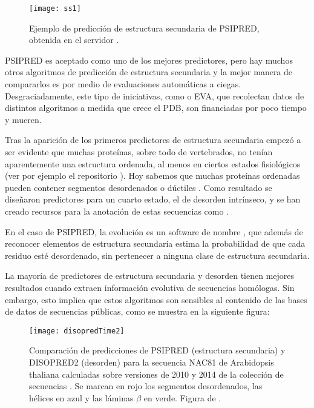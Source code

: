 \begin{figure}
\begin{center} 
\texttt{[image: ss1]}
\caption%
{
Ejemplo de predicci\'{o}n de estructura secundaria de PSIPRED, 
obtenida en el servidor .
}
\label{fig:psipred}
\end{center}
\end{figure}

PSIPRED es aceptado como uno de los mejores predictores, pero hay muchos otros algoritmos de predicci\'{o}n de estructura secundaria y 
la mejor manera de compararlos es por medio de evaluaciones autom\'{a}ticas a ciegas. Desgraciadamente, este tipo de iniciativas, como  
 o EVA,  
que recolectan datos de distintos algoritmos a medida que crece el PDB, son financiadas por poco tiempo y mueren.

Tras la aparici\'{o}n de los primeros predictores de estructura secundaria empez\'{o} a ser evidente que muchas prote\'{i}nas, 
sobre todo de vertebrados, no ten\'{i}an aparentemente una estructura ordenada, al menos en ciertos estados fisiol\'{o}gicos 
(ver por ejemplo el repositorio  \citep{Sickmeier2007,yruela_inmaculada_2014_1066352}).
Hoy sabemos que muchas prote\'{i}nas ordenadas pueden contener segmentos desordenados o d\'{u}ctiles \citep{Lobanov2010}.
Como resultado se dise\~naron predictores para un cuarto estado, el de desorden intr\'{i}nseco, y se han creado recursos para la 
anotaci\'{o}n de estas secuencias como .

En el caso de PSIPRED, la evoluci\'{o}n es un software de nombre
 \citep{Ward2004},
que adem\'{a}s de reconocer elementos de estructura secundaria estima la probabilidad de que cada residuo est\'{e} desordenado,
sin pertenecer a ninguna clase de estructura secundaria.

La mayor\'{i}a de predictores de estructura secundaria y desorden tienen mejores resultados cuando
extraen informaci\'{o}n evolutiva de secuencias hom\'{o}logas. Sin embargo, esto implica que 
estos algoritmos son sensibles al contenido de las bases de datos de secuencias p\'{u}blicas, 
como se muestra en la siguiente figura:

\begin{figure}
\begin{center} 
\texttt{[image: disopredTime2]}
\caption%
{
Comparaci\'{o}n de predicciones de PSIPRED (estructura secundaria) y DISOPRED2 (desorden) 
para la secuencia NAC81 de Arabidopsis thaliana calculadas sobre versiones de 2010 y 2014 
de la colecci\'{o}n de secuencias .
Se marcan en rojo los segmentos desordenados, las h\'{e}lices en azul y las l\'{a}minas $\beta$ en verde.
Figura de \citet{Yruela2014}.
}
\label{fig:disopredTime}
\end{center}
\end{figure}

